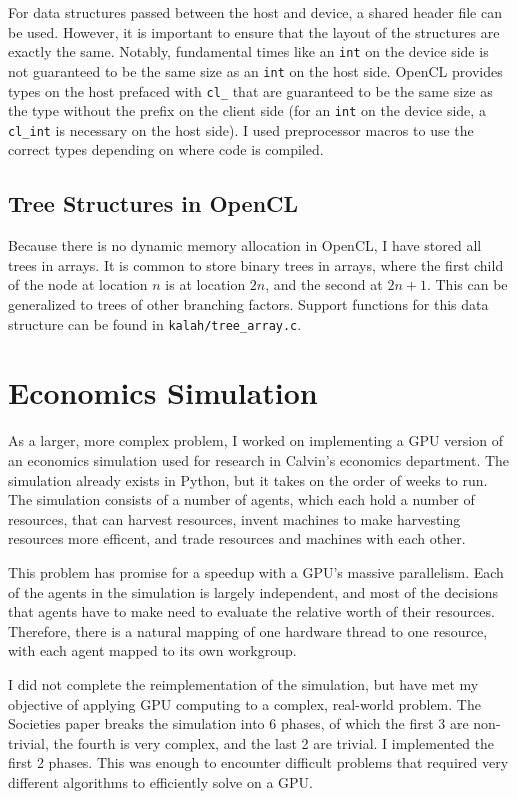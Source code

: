 \documentclass{article}
\begin{document}
For data structures passed between the host and device, a shared header file can be used. However, it is important to ensure that the layout of the structures are exactly the same. Notably, fundamental times like an \texttt{int} on the device side is not guaranteed to be the same size as an \texttt{int} on the host side. OpenCL provides types on the host prefaced with \texttt{cl\_} that are guaranteed to be the same size as the type without the prefix on the client side (for an \texttt{int} on the device side, a \texttt{cl\_int} is necessary on the host side). I used preprocessor macros to use the correct types depending on where code is compiled.

\subsection{Tree Structures in OpenCL}
Because there is no dynamic memory allocation in OpenCL, I have stored all trees in arrays. It is common to store binary trees in arrays, where the first child of the node at location $n$ is at location $2n$, and the second at $2n + 1$. This can be generalized to trees of other branching factors. Support functions for this data structure can be found in \texttt{kalah/tree\_array.c}.

\section{Economics Simulation}
As a larger, more complex problem, I worked on implementing a GPU version of an economics simulation used for research in Calvin's economics department.\cite{ditta13} The simulation already exists in Python, but it takes on the order of weeks to run. The simulation consists of a number of agents, which each hold a number of resources, that can harvest resources, invent machines to make harvesting resources more efficent, and trade resources and machines with each other.

This problem has promise for a speedup with a GPU's massive parallelism. Each of the agents in the simulation is largely independent, and most of the decisions that agents have to make need to evaluate the relative worth of their resources. Therefore, there is a natural mapping of one hardware thread to one resource, with each agent mapped to its own workgroup.

I did not complete the reimplementation of the simulation, but have met my objective of applying GPU computing to a complex, real-world problem. The Societies paper\cite{ditta13} breaks the simulation into 6 phases, of which the first 3 are non-trivial, the fourth is very complex, and the last 2 are trivial. I implemented the first 2 phases. This was enough to encounter difficult problems that required very different algorithms to efficiently solve on a GPU.
\end{document}
